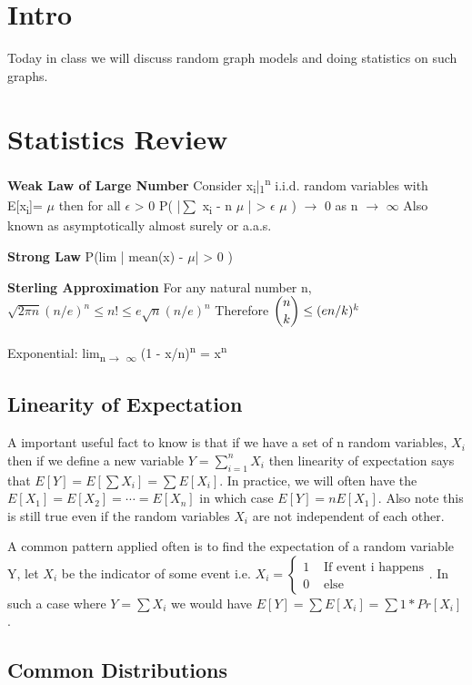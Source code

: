 \documentclass[11pt]{article}
\author{Calvin Roth}
\date{\today}
\title{}
\begin{document}
\section{Intro}
\label{sec:org601d5dd}
Today in class we will discuss random graph models and doing statistics on such graphs.

\section{Statistics Review}
\label{sec:org20cecfd}
\textbf{Weak Law of Large Number} Consider x\textsubscript{i}|\textsubscript{1}\textsuperscript{n} i.i.d. random variables with E[x\textsubscript{i}]= \(\mu\) then for all \(\epsilon\) > 0
P( |\(\sum\) x\textsubscript{i} - n \(\mu\) | > \(\epsilon\) \(\mu\) ) \(\to\) 0  as n \(\to\) \(\infty\)
Also known as asymptotically almost surely or a.a.s.

\textbf{Strong Law} P(lim | mean(x) - \(\mu\)| > 0 )

\textbf{Sterling Approximation} For any natural number n,
  $\sqrt{2\pi n} (n/e)^{n} \leq  n! \leq  e\sqrt{n} (n/e)^{n}$
  Therefore $\dbinom{n}{k} \leq (en/k)^{k}$

Exponential: lim\textsubscript{n\(\to\) \(\infty\)} (1 - x/n)\textsuperscript{n} = x\textsuperscript{n}

\subsection{Linearity of Expectation}
\label{sec:org560b2d0}
A important useful fact to know is that if we have a set of n random variables, \(X_{i}\) then if we define a new variable \(Y = \sum_{i=1}^{n} X_{i}\) then linearity of expectation says that \(E[Y] = E[\sum X_{i}] = \sum E[X_{i}]\). In practice, we will often have the \(E[X_{1}] = E[X_{2}] = \cdots = E[X_{n}]\) in which case \(E[Y] = n E[X_{1}]\). Also note this is still true even if the random variables \(X_{i}\) are not independent of each other.

A common pattern applied often is to find the expectation of a random variable Y, let \(X_{i}\) be the indicator of some event i.e. \(X_{i} = \begin{cases} 1 & \text{ If event i happens} \\ 0 & \text{ else} \end{cases}\). In such a case where \(Y = \sum X_{i}\) we would have \(E[Y] = \sum E[X_{i}] = \sum 1*Pr[X_{i}]\).


\subsection{Common Distributions}
\label{sec:org6b3cacb}
\end{document}

